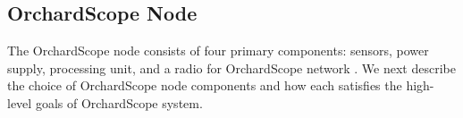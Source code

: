 

\subsection{OrchardScope Node}

The OrchardScope node consists of four primary components: sensors, power supply, processing unit, and a radio for OrchardScope network
. We next describe the choice of OrchardScope node components and how each satisfies the high-level goals of OrchardScope system. 



